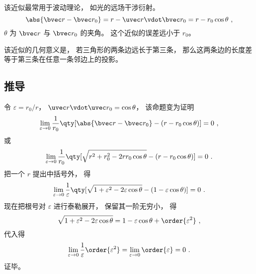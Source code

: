 

该近似最常用于波动理论， 如光的远场干涉衍射。
\begin{equation}
\abs{\bvec r - \bvec r_0} = r - \uvec r \vdot \bvec r_0 = r - r_0 \cos\theta~,
\end{equation}
$\theta$ 为 $\bvec r$ 与 $\bvec r_0$ 的夹角。 这个近似的误差远小于 $r_0$。

该近似的几何意义是， 若三角形的两条边远长于第三条， 那么这两条边的长度差等于第三条在任意一条邻边上的投影。 %

\subsection{推导}

令 $\varepsilon = r_0 / r$， $\uvec r \vdot \uvec r_0 = \cos\theta$， 该命题变为证明
\begin{equation}
\lim_{\varepsilon \to 0} \frac{1}{r_0} \qty[\abs{\bvec r - \bvec r_0} - (r - r_0 \cos\theta)] = 0~,
\end{equation}
或
\begin{equation}
\lim_{\varepsilon \to 0} \frac{1}{r_0} \qty[\sqrt{r^2 + r_0^2 - 2rr_0\cos\theta} - (r - r_0 \cos\theta)] = 0~.
\end{equation}
把一个 $r$ 提出中括号外， 得
\begin{equation}
\lim_{\varepsilon \to 0} \frac{1}{\varepsilon} \qty[\sqrt{1 + \varepsilon^2 - 2\varepsilon\cos\theta} - (1 - \varepsilon \cos\theta)] = 0~.
\end{equation}
现在把根号对 $\varepsilon$ 进行泰勒展开， 保留其一阶无穷小， 得
\begin{equation}
\sqrt{1 + \varepsilon^2 - 2\varepsilon\cos\theta} = 1 - \varepsilon \cos\theta + \order{\varepsilon^2}~,
\end{equation}
代入得
\begin{equation}
\lim_{\varepsilon \to 0} \frac1\varepsilon \order{\varepsilon^2} = \lim_{\varepsilon \to 0} \order{\varepsilon} = 0~.
\end{equation}
证毕。

